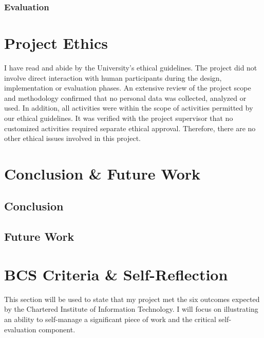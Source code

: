 \documentclass[12pt]{article}
\begin{document}
\subsubsection{Evaluation}

\section{Project Ethics}
I have read and abide by the University’s ethical guidelines\cite{UoL_COMP390_2023-24}. The project did not involve direct interaction with human
participants during the design, implementation or evaluation phases. An extensive review of the project scope and methodology
confirmed that no personal data was collected, analyzed or used. In addition, all activities were within the scope of activities
permitted by our ethical guidelines. It was verified with the project supervisor that no customized activities required separate
ethical approval. Therefore, there are no other ethical issues involved in this project.
\section{Conclusion \& Future Work}
\subsection{Conclusion}

\subsection{Future Work}

\section{BCS Criteria \& Self-Reflection}
This section will be used to state that my project met the six outcomes expected by the Chartered Institute of Information Technology\cite{BCS2020}.
I will focus on illustrating an ability to self-manage a significant piece of work and the critical self-evaluation component.
\end{document}
